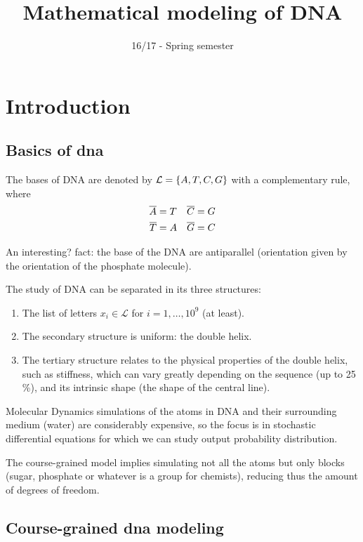 \documentclass[palatino]{epflnotes}
\title{Mathematical modeling of DNA}
\author{}
\date{16/17 - Spring semester}
\begin{document}
\frontmatter
\pagestyle{plain}
\maketitle

\tableofcontents
\mainmatter

\chapter{Introduction}

\section{Basics of dna}

The bases of DNA are denoted by $\mathcal{L} = \set{A,T,C,G}$ with a complementary  rule, where \begin{align*}
\overline{A} &= T &\overline{C} &= G \\
\overline{T} &= A &\overline{G} &= C
\end{align*}

An interesting? fact: the base of the DNA are antiparallel (orientation given by the orientation of the phosphate molecule).

The study of DNA can be separated in its three structures:
\begin{enumerate}
	\item The list of letters $x_i ∈ \mathcal{L} $ for $i = 1, \dotsc, 10^9$ (at least).
	\item The secondary structure is uniform: the double helix.
	\item The tertiary structure relates to the physical properties of the double helix, such as stiffness, which can vary greatly depending on the sequence (up to 25 \%), and its intrinsic shape (the shape of the central line).
\end{enumerate}

Molecular Dynamics simulations of the atoms in DNA and their surrounding medium (water) are considerably expensive, so the focus is in stochastic differential equations for which we can study output probability distribution.

The course-grained model implies simulating not all the atoms but only blocks (sugar, phosphate or whatever is a group for chemists), reducing thus the amount of degrees of freedom.

\section{Course-grained dna modeling}
\end{document}
